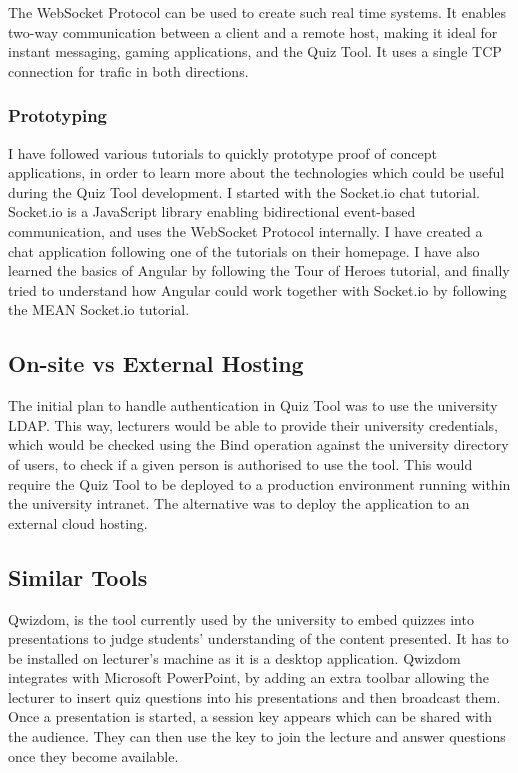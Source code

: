 The WebSocket Protocol can be used to create such real time systems. It enables two-way
communication between a client and a remote host, making it ideal for instant messaging,
gaming applications, and the Quiz Tool. It uses a single TCP connection for trafic
in both directions\cite{11}.

\subsubsection{Prototyping}
I have followed various tutorials to quickly prototype proof of concept applications,
in order to learn more about the technologies which could be useful during the Quiz Tool
development. I started with the Socket.io chat tutorial. Socket.io is
a JavaScript library enabling bidirectional event-based communication, and uses
the WebSocket Protocol internally\cite{12}. I have created a chat application following one
of the tutorials on their homepage\cite{13}. I have also learned the basics of
Angular by following the Tour of Heroes tutorial\cite{14}, and finally tried to
understand how Angular could work together with Socket.io by following the MEAN
Socket.io tutorial\cite{15}.

\subsection{On-site vs External Hosting}
The initial plan to handle authentication in Quiz Tool was to use the university
LDAP\cite{16}. This way, lecturers would be able to provide their university credentials,
which would be checked using the Bind operation against the university directory of users,
to check if a given person is authorised to use the tool. This would require the Quiz Tool
to be deployed to a production environment running within the university intranet. The
alternative was to deploy the application to an external cloud hosting.

\subsection{Similar Tools}
Qwizdom\cite{1}, is the tool currently used by the university to embed quizzes into
presentations to judge students' understanding of the content presented. It has to be
installed on lecturer's machine as it is a desktop application. Qwizdom integrates
with Microsoft PowerPoint\cite{17}, by adding an extra toolbar allowing the lecturer
to insert quiz questions into his presentations and then broadcast them. Once
a presentation is started, a session key appears which can be shared with the audience.
They can then use the key to join the lecture and answer questions once they become available.

